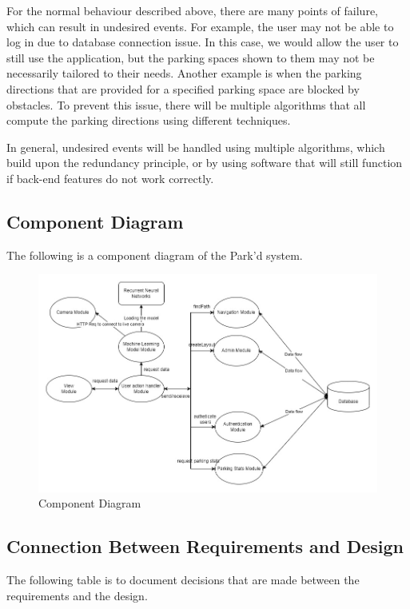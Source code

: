 \documentclass[12pt, titlepage]{article}
\begin{document}
For the normal behaviour described above, there are many points of failure,
which can result in undesired events. For example, the user may not be able to
log in due to database connection issue. In this case, we would allow the user
to still use the application, but the parking spaces shown to them may not be
necessarily tailored to their needs. Another example is when the parking
directions that are provided for a specified parking space are blocked by
obstacles. To prevent this issue, there will be multiple algorithms that all
compute the parking directions using different techniques.

In general, undesired events will be handled using multiple algorithms, which
build upon the redundancy principle, or by using software that will still
function if back-end features do not work correctly.


\newpage
\subsection{Component Diagram}
The following is a component diagram of the Park'd system.

\begin{figure}[ht]
    \includegraphics[scale=0.55]{component.jpg}
    \caption{Component Diagram}
\end{figure}


\newpage
\subsection{Connection Between Requirements and Design} \label{SecConnection}
The following table is to document decisions that are made between the
requirements and the design.
\end{document}

